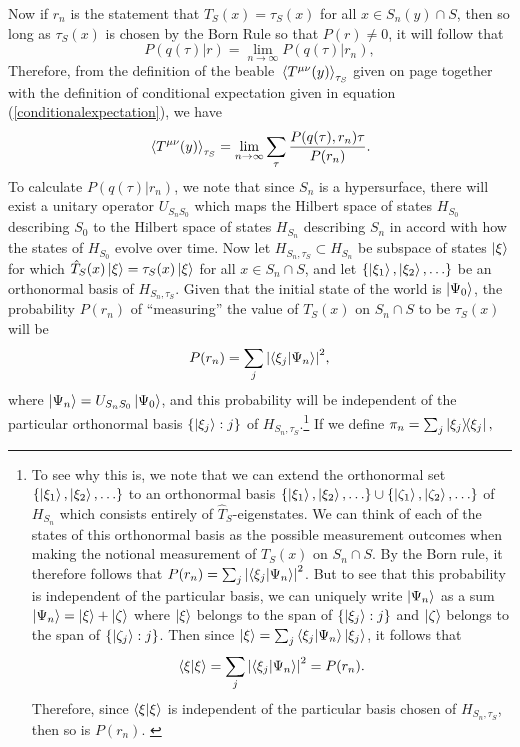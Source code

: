  Now if $r_n$ is the statement that  $T_S(x)=\tau_S(x)$ for all $x\in S_n(y)\cap S$, then so long as $\tau_S(x)$ is chosen by the Born Rule so that $P(r)\neq 0$, it will follow that
 \begin{equation}
	P(q(\tau)|r)=\lim_{n\rightarrow\infty}P(q(\tau)|r_n),
 \end{equation}
 Therefore, from the definition of the beable $\ev*{T^{\mu\nu}(y)}_{\tau_S}$ given on page \pageref{Kentbeable} together with the definition of conditional expectation given in equation (\ref{conditionalexpectation}), we have 
\begin{equation}\label{beable1}
\ev*{T^{\mu\nu}(y)}_{\tau_S}=\lim_{n\rightarrow\infty}\sum_\tau\frac{P(q(\tau),r_n)\tau}{P(r_n)}.
\end{equation} 
 To calculate $P(q(\tau)|r_n)$, we note that since $S_n$ is a hypersurface,   there will exist a unitary operator $U_{S_nS_0}$ which maps the Hilbert space of states $H_{S_0}$ describing $S_0$ to the Hilbert space of states $H_{S_n}$\label{HSidef} describing $S_n$ in accord with how the states of $H_{S_0}$  evolve over time. Now let $H_{S_n,\tau_S}\subset H_{S_n}$ be subspace of states $\ket{\xi}$ for which  $\hat{T}_S(x)\ket{\xi}=\tau_S(x)\ket{\xi}$  for all $x\in S_n\cap S$, and  let $\{\ket{\xi_1},\ket{\xi_2},\ldots\}$ be an orthonormal basis of $H_{S_n,\tau_S}$. Given that the initial state of the world is $\ket{\Psi_0}$, the probability $P(r_n)$ of ``measuring'' the value of $T_S(x)$ on $S_n\cap S$ to be $\tau_S(x)$ will be 
\begin{equation}\label{Pri}
P(r_n)=\sum_j \abs{ \ip{\xi_j}{\Psi_n}}^2,
\end{equation}
where $\ket{\Psi_n}=U_{S_nS_0}\ket{\Psi_0}$, and this probability will be independent of the particular orthonormal basis  $\{\ket{\xi_j}:j\}$ of $H_{S_n,\tau_S}$.\footnote{To see why this is, we note that we can extend the orthonormal set $\{\ket{\xi_1},\ket{\xi_2},\ldots\}$ to an orthonormal basis  $\{\ket{\xi_1},\ket{\xi_2},\ldots\}\cup\{\ket{\zeta_1},\ket{\zeta_2},\ldots\}$ of $H_{S_n}$ which consists entirely of $\hat{T}_S$-eigenstates. We can think of each of the states of this orthonormal basis as the possible measurement outcomes when making the notional measurement of $T_S(x)$ on $S_n\cap S$. By the Born rule, it therefore follows that $P(r_n)=\sum_j \abs{ \ip{\xi_j}{\Psi_n}}^2$. But to see that this probability is independent of the particular basis, we can uniquely write $\ket{\Psi_n}$ as a sum $\ket{\Psi_n}=\ket{\xi}+\ket{\zeta}$ where $\ket{\xi}$ belongs to the span of $\{\ket{\xi_j}:j\}$ and $\ket{\zeta}$ belongs to the span of $\{\ket{\zeta_j}:j\}$.  Then since $\ket{\xi}=\sum_j\ip{\xi_j}{\Psi_n}\ket{\xi_j}$, it follows that $$\ip{\xi}{\xi}=\sum_j\abs{ \ip{\xi_j}{\Psi_n}}^2=P(r_n).$$ Therefore, since  $\ip{\xi}{\xi}$ is independent of the particular basis chosen of $H_{S_n,\tau_S}$, then so is $P(r_n)$.  \label{priproof} } If we define $\pi_n=\sum_j\dyad{\xi_j},$
